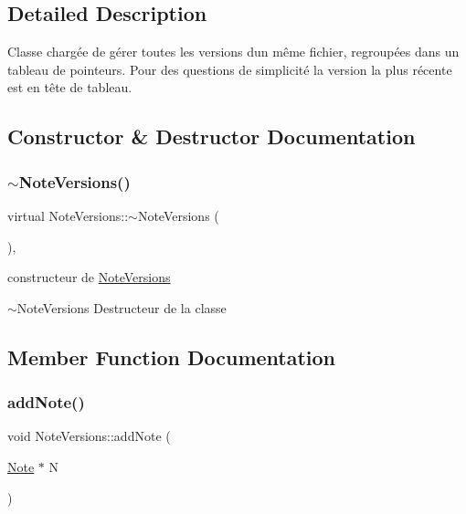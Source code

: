\subsection{Detailed Description}
Classe chargée de gérer toutes les versions d\textquotesingle{}un même fichier, regroupées dans un tableau de pointeurs. Pour des questions de simplicité la version la plus récente est en tête de tableau. 

\subsection{Constructor \& Destructor Documentation}
\mbox{\label{classNoteVersions_a4e44ca55ef4a836e1da94933b87b1148}} 
\subsubsection{\texorpdfstring{$\sim$\+Note\+Versions()}{~NoteVersions()}}
{\footnotesize\ttfamily virtual Note\+Versions\+::$\sim$\+Note\+Versions (\begin{DoxyParamCaption}{ }\end{DoxyParamCaption})\hspace{0.3cm}{\ttfamily [inline]}, {\ttfamily [virtual]}}



constructeur de \hyperlink{classNoteVersions}{Note\+Versions} 

$\sim$\+Note\+Versions Destructeur de la classe 

\subsection{Member Function Documentation}
\mbox{\label{classNoteVersions_aa3cea52090130714aae7ba4a6383c563}} 
\subsubsection{\texorpdfstring{add\+Note()}{addNote()}}
{\footnotesize\ttfamily void Note\+Versions\+::add\+Note (\begin{DoxyParamCaption}\item[{\hyperlink{classNote}{Note} $\ast$}]{N }\end{DoxyParamCaption})}



